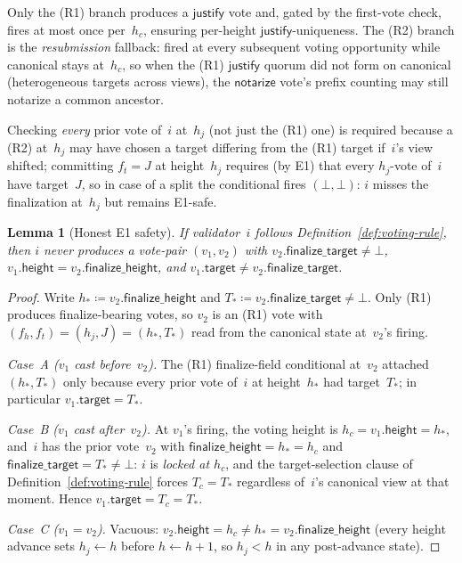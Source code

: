 \documentclass{article}
\newcommand{\target}{\mathsf{target}}
\newcommand{\height}{\mathsf{height}}
\newcommand{\just}{\ensuremath{\mathsf{justify}}\xspace}
\newcommand{\notar}{\ensuremath{\mathsf{notarize}}\xspace}
\newcommand{\finalizeHeight}{\mathsf{finalize\_height}}
\newcommand{\finalizeTarget}{\mathsf{finalize\_target}}
\theoremstyle{plain}
\newtheorem{lemma}{Lemma}
\theoremstyle{definition}
\theoremstyle{remark}
\begin{document}
Only the (R1) branch produces a \just vote and, gated by the first-vote check, fires at most once per~$h_c$, ensuring per-height \just-uniqueness.
The (R2) branch is the \emph{resubmission} fallback: fired at every subsequent voting opportunity while canonical stays at~$h_c$, so when the (R1) \just quorum did not form on canonical (heterogeneous targets across views), the \notar vote's prefix counting may still notarize a common ancestor.

Checking \emph{every} prior vote of~$i$ at~$h_j$ (not just the (R1) one) is required because a (R2) at~$h_j$ may have chosen a target differing from the (R1) target if~$i$'s view shifted; committing $f_t = J$ at height~$h_j$ requires (by E1) that every $h_j$-vote of~$i$ have target~$J$, so in case of a split the conditional fires $(\bot, \bot)$: $i$ misses the finalization at~$h_j$ but remains E1-safe.

\begin{lemma}[Honest E1 safety]\label{lem:honest-e1-safety}
If validator~$i$ follows Definition~\ref{def:voting-rule}, then $i$ never produces a vote-pair $(v_1, v_2)$ with $v_2.\finalizeTarget \neq \bot$, $v_1.\height = v_2.\finalizeHeight$, and $v_1.\target \neq v_2.\finalizeTarget$.
\end{lemma}

\begin{proof}
Write $h_\ast \coloneqq v_2.\finalizeHeight$ and $T_\ast \coloneqq v_2.\finalizeTarget \neq \bot$.
Only (R1) produces finalize-bearing votes, so $v_2$ is an (R1) vote with $(f_h, f_t) = (h_j, J) = (h_\ast, T_\ast)$ read from the canonical state at~$v_2$'s firing.

\emph{Case~A ($v_1$ cast before~$v_2$).}
The (R1) finalize-field conditional at~$v_2$ attached $(h_\ast, T_\ast)$ only because every prior vote of~$i$ at height~$h_\ast$ had target~$T_\ast$; in particular $v_1.\target = T_\ast$.

\emph{Case~B ($v_1$ cast after~$v_2$).}
At $v_1$'s firing, the voting height is $h_c = v_1.\height = h_\ast$, and~$i$ has the prior vote~$v_2$ with $\finalizeHeight = h_\ast = h_c$ and $\finalizeTarget = T_\ast \neq \bot$: $i$ is \emph{locked at $h_c$}, and the target-selection clause of Definition~\ref{def:voting-rule} forces $T_c = T_\ast$ regardless of~$i$'s canonical view at that moment.
Hence $v_1.\target = T_c = T_\ast$.

\emph{Case~C ($v_1 = v_2$).}
Vacuous: $v_2.\height = h_c \neq h_\ast = v_2.\finalizeHeight$ (every height advance sets $h_j \gets h$ before $h \gets h + 1$, so $h_j < h$ in any post-advance state).
\end{proof}
\end{document}
